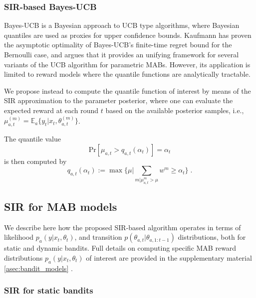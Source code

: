\documentclass{article}
\newcommand{\ie}{i.e., }
\def\addappendix{}
\begin{document}
\subsubsection{SIR-based Bayes-UCB}
\label{sssec:sir-bucb}

Bayes-UCB \cite{ip-Kaufmann2012} is a Bayesian approach to UCB type algorithms, where Bayesian quantiles are used as proxies for upper confidence bounds. Kaufmann \cite{ip-Kaufmann2012} has proven the asymptotic optimality of Bayes-UCB's finite-time regret bound for the Bernoulli case, and argues that it provides an unifying framework for several variants of the UCB algorithm for parametric MABs. However, its application is limited to reward models where the quantile functions are analytically tractable.

We propose instead to compute the quantile function of interest by means of the SIR approximation to the parameter posterior, where one can evaluate the expected reward at each round $t$ based on the available posterior samples, \ie $\mu_{a,t}^{(m)}=\mathbb{E}_{a}\{y_t|x_t,\theta_{a,t}^{(m)}\}$.

The quantile value
\begin{equation}
\mathrm{Pr}[\mu_{a,t}>q_{a,t}(\alpha_t)] = \alpha_{t}
\end{equation}
is then computed by
\begin{equation}
q_{a,t}(\alpha_t):=\max \{\mu|\sum_{m|\mu_{a,t}^m>\mu} w^m\ge\alpha_t\} \; .
\label{eq:mc_quantile_value}
\end{equation}

\subsection{SIR for MAB models}
\label{ssec:sir-models}

We describe here how the proposed SIR-based algorithm operates in terms of likelihood $p_a(y|x_t,\theta_t)$, and transition $p(\theta_{a,t}|\theta_{a,1:t-1})$ distributions, both for static and dynamic bandits. Full details on computing specific MAB reward distributions $p_a(y|x_t,\theta_t)$ of interest are provided in
\ifx\addappendix\undefined the supplementary material \else \autoref{asec:bandit_models} \fi .

\subsubsection{SIR for static bandits}
\label{sssec:static_bandits}
\end{document}
